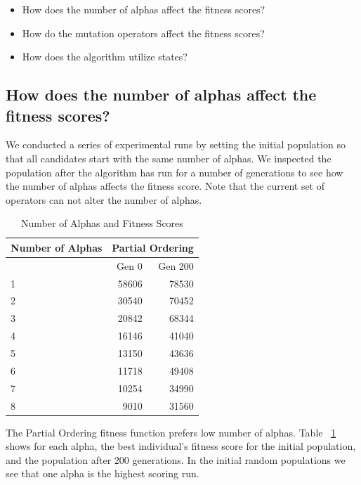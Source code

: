 \documentclass[conference]{IEEEtran}
\begin{document}
\begin{itemize}
\item How does the number of alphas affect the fitness scores?
\item How do the mutation operators affect the fitness scores?
\item How does the algorithm utilize states?
\end{itemize}

\subsection{How does the number of alphas affect the fitness scores?}
We conducted a series of experimental runs by setting the initial population so that all candidates start with the same number of alphas. We inspected the population after the algorithm has run for a number of generations to see how the number of alphas affects the fitness score. Note that the current set of operators can not alter the number of alphas.

\begin{table}[h]
\caption{Number of Alphas and Fitness Scores}
\label{NumberOfAlphas}
\centering
\begin{tabular}{|l|r|r|}
\hline
Number of Alphas & \multicolumn{2}{c|}{Partial Ordering} \\ \hline
                 & Gen 0            & Gen 200            \\ \hline
{ 1 } & { 58606 } & { 78530 } \\ \hline
{ 2 } & { 30540 } & { 70452 } \\ \hline
{ 3 } & { 20842 } & { 68344 } \\ \hline
{ 4 } & { 16146 } & { 41040 } \\ \hline
{ 5 } & { 13150 } & { 43636 } \\ \hline
{ 6 } & { 11718 } & { 49408 } \\ \hline
{ 7 } & { 10254 } & { 34990 } \\ \hline
{ 8 } & {  9010 } & { 31560 } \\ \hline
\end{tabular}
\end{table}

The Partial Ordering fitness function prefers low number of alphas. Table ~\ref{NumberOfAlphas} shows for each alpha, the best individual's fitness score for the initial population, and the population after 200 generations. In the initial random populations we see that one alpha is the highest scoring run.
\end{document}
